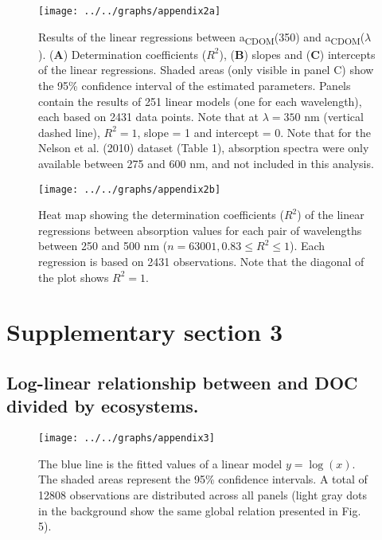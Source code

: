 \documentclass[12pt,a4paper]{scrartcl}
\begin{document}


\begin{figure}[h]
	\ContinuedFloat*
	\centering
	\texttt{[image: ../../graphs/appendix2a]}
	\caption{\label{first}Results of the linear regressions between a\textsubscript{CDOM}(350) and a\textsubscript{CDOM}($\lambda$). (\textbf{A}) Determination coefficients ($R^2$), (\textbf{B}) slopes and (\textbf{C}) intercepts of the linear regressions. Shaded areas (only visible in panel C) show the 95\% confidence interval of the estimated parameters. Panels contain the results of 251 linear models (one for each wavelength), each based on 2431 data points. Note that at $\lambda = 350$ nm (vertical dashed line), $R^2 = 1$, slope = 1 and intercept = 0. Note that for the Nelson et al. (2010) dataset (Table 1), absorption spectra were only available between 275 and 600 nm, and not included in this analysis.}
\end{figure}

\begin{figure}[h]
	\ContinuedFloat
	\centering
	\texttt{[image: ../../graphs/appendix2b]}
	\caption{\label{second}Heat map showing the determination coefficients ($R^2$) of the linear regressions between absorption values for each pair of wavelengths between 250 and 500 nm ($n = 63001, 0.83 \le R^2 \le 1$). Each regression is based on 2431 observations. Note that the diagonal of the plot shows $R^2 = 1$. }
\end{figure}

\clearpage
\newpage

\section*{Supplementary section 3}
\subsection*{Log-linear relationship between  and DOC divided by ecosystems.}

\begin{figure}[h]
	\centering
	\texttt{[image: ../../graphs/appendix3]}

	\caption{The blue line is the fitted values of a linear model $y = \log(x)$. The shaded areas represent the 95\% confidence intervals. A total of 12808 observations are distributed across all panels (light gray dots in the background show the same global relation presented in Fig. 5).}
\end{figure}
\end{document}
